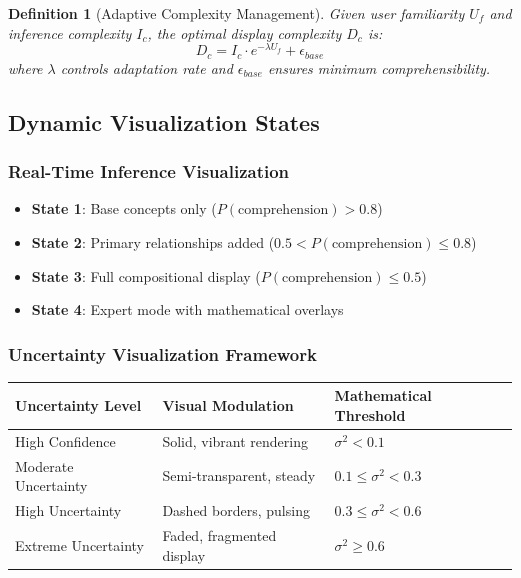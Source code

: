 \documentclass[12pt]{article}
\newtheorem{definition}{Definition}
\begin{document}
\begin{definition}[Adaptive Complexity Management]
Given user familiarity $U_f$ and inference complexity $I_c$, the optimal display complexity $D_c$ is:
\begin{equation}
D_c = I_c \cdot e^{-\lambda U_f} + \epsilon_{base}
\end{equation}
where $\lambda$ controls adaptation rate and $\epsilon_{base}$ ensures minimum comprehensibility.
\end{definition}

\subsection{Dynamic Visualization States}

\subsubsection{Real-Time Inference Visualization}

\begin{itemize}
    \item \textbf{State 1}: Base concepts only ($P(\text{comprehension}) > 0.8$)
    \item \textbf{State 2}: Primary relationships added ($0.5 < P(\text{comprehension}) \leq 0.8$)
    \item \textbf{State 3}: Full compositional display ($P(\text{comprehension}) \leq 0.5$)
    \item \textbf{State 4}: Expert mode with mathematical overlays
\end{itemize}

\subsubsection{Uncertainty Visualization Framework}

\begin{tabularx}{\textwidth}{|l|l|X|}
\hline
\textbf{Uncertainty Level} & \textbf{Visual Modulation} & \textbf{Mathematical Threshold} \\
\hline
High Confidence & Solid, vibrant rendering & $\sigma^2 < 0.1$ \\
\hline
Moderate Uncertainty & Semi-transparent, steady & $0.1 \leq \sigma^2 < 0.3$ \\
\hline
High Uncertainty & Dashed borders, pulsing & $0.3 \leq \sigma^2 < 0.6$ \\
\hline
Extreme Uncertainty & Faded, fragmented display & $\sigma^2 \geq 0.6$ \\
\hline
\end{tabularx}
\end{document}
